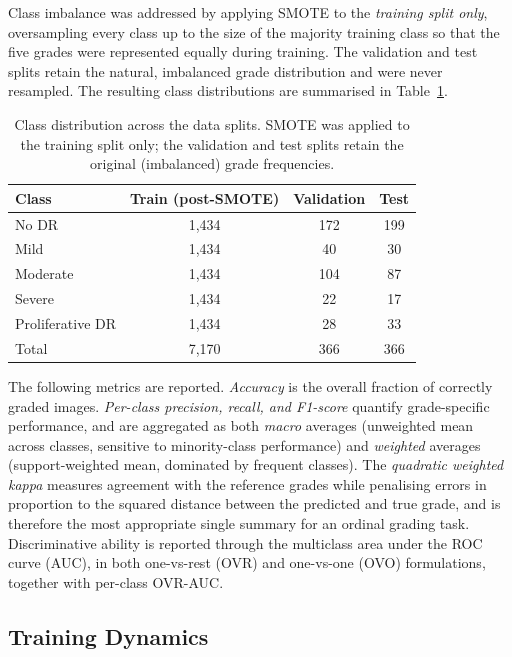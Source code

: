 Class imbalance was addressed by applying SMOTE to the \emph{training split only},
oversampling every class up to the size of the majority training class so that the
five grades were represented equally during training. The validation and test
splits retain the natural, imbalanced grade distribution and were never resampled.
The resulting class distributions are summarised in
Table~\ref{tab:data_distribution}.

\begin{table}[H]
\centering
\caption{Class distribution across the data splits. SMOTE was applied to the
training split only; the validation and test splits retain the original
(imbalanced) grade frequencies.}
\label{tab:data_distribution}
\begin{tabular}{lccc}
\toprule
Class & Train (post-SMOTE) & Validation & Test \\
\midrule
No DR            & 1{,}434 & 172 & 199 \\
Mild             & 1{,}434 &  40 &  30 \\
Moderate         & 1{,}434 & 104 &  87 \\
Severe           & 1{,}434 &  22 &  17 \\
Proliferative DR & 1{,}434 &  28 &  33 \\
\midrule
Total            & 7{,}170 & 366 & 366 \\
\bottomrule
\end{tabular}
\end{table}

The following metrics are reported. \emph{Accuracy} is the overall fraction of
correctly graded images. \emph{Per-class precision, recall, and F1-score} quantify
grade-specific performance, and are aggregated as both \emph{macro} averages
(unweighted mean across classes, sensitive to minority-class performance) and
\emph{weighted} averages (support-weighted mean, dominated by frequent classes).
The \emph{quadratic weighted kappa} measures agreement with the reference grades
while penalising errors in proportion to the squared distance between the predicted
and true grade, and is therefore the most appropriate single summary for an ordinal
grading task. Discriminative ability is reported through the multiclass area under
the ROC curve (AUC), in both one-vs-rest (OVR) and one-vs-one (OVO) formulations,
together with per-class OVR-AUC.

\subsection{Training Dynamics}
\label{subsec:training_dynamics}

